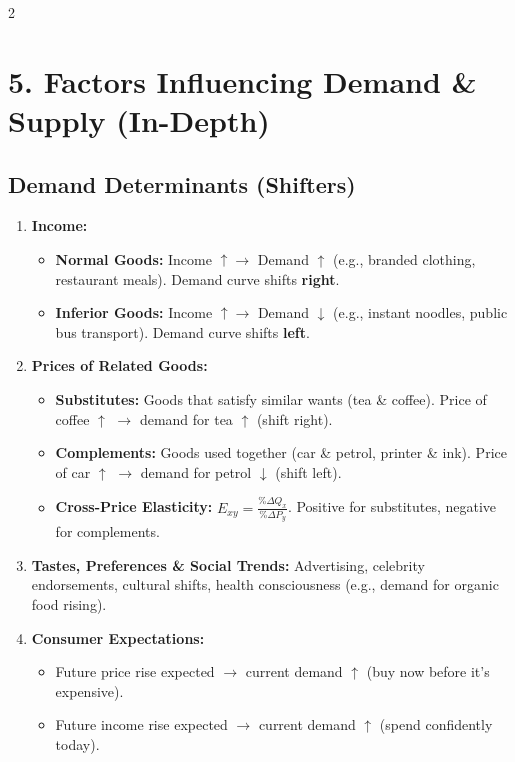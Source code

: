 \documentclass[10pt,a4paper]{article}
\begin{document}
\begin{multicols}{2}
\section*{5. Factors Influencing Demand \& Supply (In-Depth)}

\subsection*{Demand Determinants (Shifters)}
\begin{enumerate}[leftmargin=*,nosep]
    \item \textbf{Income:}
    \begin{itemize}[nosep]
        \item \textbf{Normal Goods:} Income $\uparrow \to$ Demand $\uparrow$ (e.g., branded clothing, restaurant meals). Demand curve shifts \textbf{right}.
        \item \textbf{Inferior Goods:} Income $\uparrow \to$ Demand $\downarrow$ (e.g., instant noodles, public bus transport). Demand curve shifts \textbf{left}.
    \end{itemize}
    \item \textbf{Prices of Related Goods:}
    \begin{itemize}[nosep]
        \item \textbf{Substitutes:} Goods that satisfy similar wants (tea \& coffee). Price of coffee $\uparrow$ $\to$ demand for tea $\uparrow$ (shift right).
        \item \textbf{Complements:} Goods used together (car \& petrol, printer \& ink). Price of car $\uparrow$ $\to$ demand for petrol $\downarrow$ (shift left).
        \item \textbf{Cross-Price Elasticity:} $E_{xy} = \frac{\%\Delta Q_x}{\%\Delta P_y}$. Positive for substitutes, negative for complements.
    \end{itemize}
    \item \textbf{Tastes, Preferences \& Social Trends:} Advertising, celebrity endorsements, cultural shifts, health consciousness (e.g., demand for organic food rising).
    \item \textbf{Consumer Expectations:}
    \begin{itemize}[nosep]
        \item Future price rise expected $\to$ current demand $\uparrow$ (buy now before it's expensive).
        \item Future income rise expected $\to$ current demand $\uparrow$ (spend confidently today).
    \end{itemize}

\end{enumerate}
\end{multicols}
\end{document}
